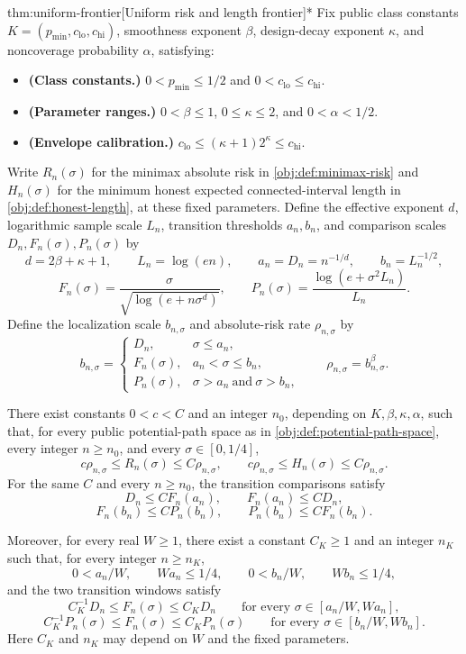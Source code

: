 \begin{theoremv}{thm:uniform-frontier}[Uniform risk and length frontier]*
Fix public class constants \(K=(p_{\min},c_{\mathrm{lo}},c_{\mathrm{hi}})\), smoothness exponent \(\beta\), design-decay exponent \(\kappa\), and noncoverage probability \(\alpha\), satisfying:
\begin{itemize}
\item \textbf{(Class constants.)} \(0<p_{\min}\le 1/2\) and \(0<c_{\mathrm{lo}}\le c_{\mathrm{hi}}\).
\item \textbf{(Parameter ranges.)} \(0<\beta\le1\), \(0\le\kappa\le2\), and \(0<\alpha<1/2\).
\item \textbf{(Envelope calibration.)} \(c_{\mathrm{lo}}\le(\kappa+1)2^\kappa\le c_{\mathrm{hi}}\).
\end{itemize}
Write \(R_n(\sigma)\) for the minimax absolute risk in \cref{obj:def:minimax-risk} and \(H_n(\sigma)\) for the minimum honest expected connected-interval length in \cref{obj:def:honest-length}, at these fixed parameters. Define the effective exponent \(d\), logarithmic sample scale \(L_n\), transition thresholds \(a_n,b_n\), and comparison scales \(D_n,F_n(\sigma),P_n(\sigma)\) by
\[
d=2\beta+\kappa+1,\qquad L_n=\log(en),\qquad
a_n=D_n=n^{-1/d},\qquad b_n=L_n^{-1/2},
\]
\[
F_n(\sigma)=\frac{\sigma}{\sqrt{\log(e+n\sigma^d)}},
\qquad
P_n(\sigma)=\frac{\log(e+\sigma^2L_n)}{L_n}.
\]
Define the localization scale \(b_{n,\sigma}\) and absolute-risk rate \(\rho_{n,\sigma}\) by
\[
b_{n,\sigma}=
\begin{cases}
D_n,&\sigma\le a_n,\\
F_n(\sigma),&a_n<\sigma\le b_n,\\
P_n(\sigma),&\sigma>a_n\ \text{and}\ \sigma>b_n,
\end{cases}
\qquad
\rho_{n,\sigma}=b_{n,\sigma}^{\beta}.
\]

There exist constants \(0<c<C\) and an integer \(n_0\), depending on \(K,\beta,\kappa,\alpha\), such that, for every public potential-path space as in \cref{obj:def:potential-path-space}, every integer \(n\ge n_0\), and every \(\sigma\in[0,1/4]\),
\[
c\rho_{n,\sigma}\le R_n(\sigma)\le C\rho_{n,\sigma},
\qquad
c\rho_{n,\sigma}\le H_n(\sigma)\le C\rho_{n,\sigma}.
\]
For the same \(C\) and every \(n\ge n_0\), the transition comparisons satisfy
\[
D_n\le C F_n(a_n),\qquad F_n(a_n)\le C D_n,
\]
\[
F_n(b_n)\le C P_n(b_n),\qquad P_n(b_n)\le C F_n(b_n).
\]

Moreover, for every real \(W\ge1\), there exist a constant \(C_K\ge1\) and an integer \(n_K\) such that, for every integer \(n\ge n_K\),
\[
0<a_n/W,\qquad Wa_n\le1/4,\qquad
0<b_n/W,\qquad Wb_n\le1/4,
\]
and the two transition windows satisfy
\[
C_K^{-1}D_n\le F_n(\sigma)\le C_KD_n
\qquad
\text{for every }\sigma\in[a_n/W,Wa_n],
\]
\[
C_K^{-1}P_n(\sigma)\le F_n(\sigma)\le C_KP_n(\sigma)
\qquad
\text{for every }\sigma\in[b_n/W,Wb_n].
\]
Here \(C_K\) and \(n_K\) may depend on \(W\) and the fixed parameters.


\end{theoremv}
